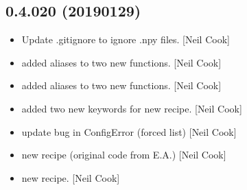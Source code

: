 \documentclass[a4paper,10pt,english]{report}
\begin{document}
\subsection{0.4.020 (2019\sphinxhyphen{}01\sphinxhyphen{}29)}
\label{\detokenize{misc/changelog:id223}}\begin{itemize}
\item {} 
Update .gitignore to ignore .npy files. {[}Neil Cook{]}

\item {} 
 \sphinxhyphen{} added aliases to two new  functions. {[}Neil
Cook{]}

\item {} 
 \sphinxhyphen{} added aliases to two new 
functions. {[}Neil Cook{]}

\item {} 
 \sphinxhyphen{} added two new keywords for new  recipe.
{[}Neil Cook{]}

\item {} 
 \sphinxhyphen{} update bug in ConfigError (forced list) {[}Neil Cook{]}

\item {} 
 \sphinxhyphen{} new  recipe (original code from E.A.) {[}Neil
Cook{]}

\item {} 
 \sphinxhyphen{} new  recipe. {[}Neil Cook{]}

\end{itemize}
\end{document}
